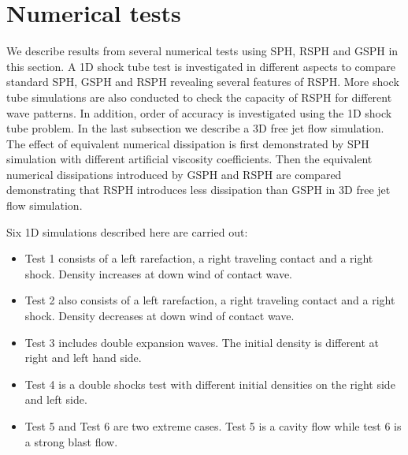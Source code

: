 \documentclass[preprint,12pt,authoryear]{elsarticle}
\begin{document}
\section{Numerical tests} \label{sec:numericaltests}
We describe results from several numerical tests using SPH, RSPH and GSPH in this section.
A 1D shock tube test is investigated in different aspects to compare standard SPH, GSPH and RSPH revealing several features of RSPH. More shock tube simulations are also conducted to check the capacity of RSPH for different wave patterns. In addition, order of accuracy is investigated using the 1D shock tube problem. In the last subsection we describe a 3D free jet flow simulation. The effect of equivalent numerical dissipation is first demonstrated by SPH simulation with different artificial viscosity coefficients. Then the equivalent numerical dissipations introduced by GSPH and RSPH are compared demonstrating that RSPH introduces less dissipation than GSPH in 3D free jet flow simulation.

Six 1D simulations described here are carried out:
\begin{itemize}%
\item Test 1 consists of a left rarefaction, a right traveling contact and a right shock. Density increases at down wind of contact wave. 
\item Test 2 also consists of a left rarefaction, a right traveling contact and a right shock. Density decreases at down wind of contact wave. 
\item Test 3 includes double expansion waves. The initial density is different at right and left hand side. 
\item Test 4 is a double shocks test with different initial densities on the right side and left side.
\item Test 5 and Test 6 are two extreme cases. Test 5 is a cavity flow while test 6 is a strong blast flow.
\end{itemize}
\end{document}
